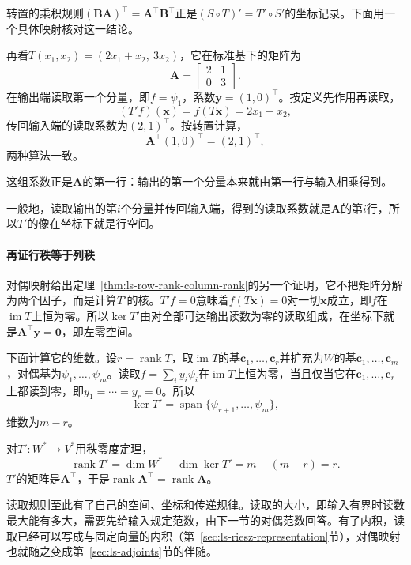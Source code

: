 转置的乘积规则$(\bm B\bm A)^\top=\bm A^\top\bm B^\top$正是$(S\circ T)'=T'\circ S'$的坐标记录。下面用一个具体映射核对这一结论。
\begin{example}[把输出的第一个分量读取传回输入端]
\label{ex:ls-dual-map-first-component}
再看$T(x_1,x_2)=(2x_1+x_2,\ 3x_2)$，它在标准基下的矩阵为
\[
 \bm A=\begin{bmatrix}2&1\\0&3\end{bmatrix}.
\]
在输出端读取第一个分量，即$f=\psi_1$，系数$\bm y=(1,0)^\top$。按定义先作用再读取，
\[
 (T'f)(\bm x)=f(T\bm x)=2x_1+x_2,
\]
传回输入端的读取系数为$(2,1)^\top$。按转置计算，
\[
 \bm A^\top(1,0)^\top=(2,1)^\top,
\]
两种算法一致。

这组系数正是$\bm A$的第一行：输出的第一个分量本来就由第一行与输入相乘得到。
\end{example}
一般地，读取输出的第$i$个分量并传回输入端，得到的读取系数就是$\bm A$的第$i$行，所以$T'$的像在坐标下就是行空间。

\paragraph{再证行秩等于列秩}
对偶映射给出定理~\ref{thm:ls-row-rank-column-rank}的另一个证明，它不把矩阵分解为两个因子，而是计算$T'$的核。$T'f=0$意味着$f(T\bm x)=0$对一切$\bm x$成立，即$f$在$\operatorname{im}T$上恒为零。所以$\ker T'$由对全部可达输出读数为零的读取组成，在坐标下就是$\bm A^\top\bm y=\bm0$，即左零空间。

下面计算它的维数。设$r=\operatorname{rank}T$，取$\operatorname{im}T$的基$\bm c_1,\ldots,\bm c_r$并扩充为$W$的基$\bm c_1,\ldots,\bm c_m$，对偶基为$\psi_1,\ldots,\psi_m$。读取$f=\sum_iy_i\psi_i$在$\operatorname{im}T$上恒为零，当且仅当它在$\bm c_1,\ldots,\bm c_r$上都读到零，即$y_1=\cdots=y_r=0$。所以
\[
 \ker T'=\operatorname{span}\{\psi_{r+1},\ldots,\psi_m\},
\]
维数为$m-r$。

对$T':W^*\to V^*$用秩零度定理，
\[
 \operatorname{rank}T'=\dim W^*-\dim\ker T'=m-(m-r)=r .
\]
$T'$的矩阵是$\bm A^\top$，于是$\operatorname{rank}\bm A^\top=\operatorname{rank}\bm A$。

读取规则至此有了自己的空间、坐标和传递规律。读取的大小，即输入有界时读数最大能有多大，需要先给输入规定范数，由下一节的对偶范数回答。有了内积，读取已经可以写成与固定向量的内积（第~\ref{sec:ls-riesz-representation}节），对偶映射也就随之变成第~\ref{sec:ls-adjoints}节的伴随。
